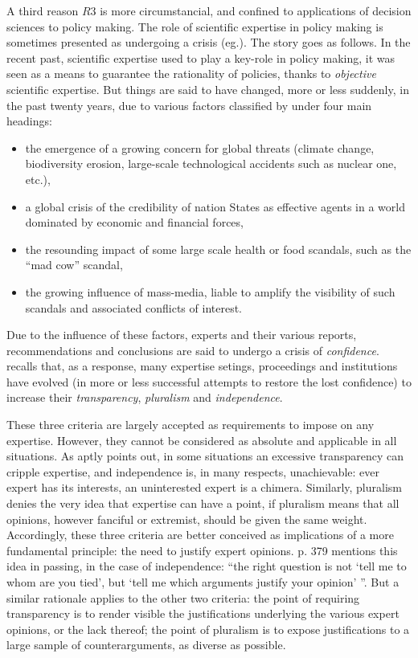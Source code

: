 \documentclass[preprint, french, english, 11pt, authoryear]{elsarticle}%
\begin{document}
A third reason $R3$ is more circumstancial, and confined to applications of decision sciences to policy making. The role of scientific expertise in policy making is sometimes presented as undergoing a crisis (eg.\citet{godard_environnement_2015}). The story goes as follows. In the recent past, scientific expertise used to play a key-role in policy making, it was seen as a means to guarantee the rationality of policies, thanks to \emph{objective} scientific expertise. But things are said to have changed, more or less suddenly, in the past twenty years, due to various factors classified by \citet{godard_environnement_2015} under four main headings:
\begin{itemize}
\item the emergence of a growing concern for global threats (climate change, biodiversity erosion, large-scale technological accidents such as nuclear one, etc.), 
\item a global crisis of the credibility of nation States as effective agents in a world dominated by economic and financial forces, 
\item the resounding impact of some large scale health or food scandals, such as the ``mad cow'' scandal,
\item the growing influence of mass-media, liable to amplify the visibility of such scandals and associated conflicts of interest.
\end{itemize}

Due to the influence of these factors, experts and their various reports, recommendations and conclusions are said to undergo a crisis of \emph{confidence}. \citet{godard_environnement_2015} recalls that, as a response, many expertise setings, proceedings and institutions have evolved (in more or less successful attempts to restore the lost confidence) to increase their \emph{transparency}, \emph{pluralism} and \emph{independence}.

These three criteria are largely accepted as requirements to impose on any expertise. However, they cannot be considered as absolute and applicable in all situations. As \citet{godard_environnement_2015} aptly points out, in some situations an excessive transparency can cripple expertise, and independence is, in many respects, unachievable: ever expert has its interests, an uninterested expert is a chimera. Similarly, pluralism denies the very idea that expertise can have a point, if pluralism means that all opinions, however fanciful or extremist, should be given the same weight. Accordingly, these three criteria are better conceived as implications of a more fundamental principle: the need to justify expert opinions. \citet{godard_environnement_2015} p. 379 mentions this idea in passing, in the case of independence: ``the right question is not `tell me to whom are you tied', but `tell me which arguments justify your opinion' ''. But a similar rationale applies to the other two criteria: the point of requiring transparency is to render visible the justifications underlying the various expert opinions, or the lack thereof; the point of pluralism is to expose justifications to a large sample of counterarguments, as diverse as possible.
\end{document}

